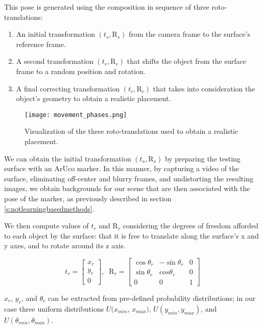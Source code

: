 This pose is generated using the composition in sequence of three roto-translations:

\begin{enumerate}
    \item An initial transformation $(t_s, \text{R}_s)$ from the camera frame to the surface's reference frame.
    \item A second transformation $(t_r, \text{R}_r)$ that shifts the object from the surface frame to a random position and rotation.
    \item A final correcting transformation $(t_c, \text{R}_c)$ that takes into consideration the object's geometry to obtain a realistic placement.
\end{enumerate}

\begin{figure}[ht]
    \texttt{[image: movement\_phases.png]}
    \caption{Visualization of the three roto-translations used to obtain a realistic placement.}
\end{figure}

We can obtain the initial transformation $(t_s, \text{R}_s)$ by preparing the testing surface with an ArUco marker. In this manner, by capturing a video of the surface, eliminating off-center and blurry frames, and undistorting the resulting images, we obtain backgrounds for our scene that are then associated with the pose of the marker, as previously described in section \ref*{s:notlearningbasedmethods}.

We then compute values of $t_r$ and $\text{R}_r$ considering the degrees of freedom afforded to each object by the surface: that it is free to translate along the surface's x and y axes, and to rotate around its z axis.

\begin{equation*}
    t_r = 
    \begin{bmatrix}
        x_r\\y_r\\0
    \end{bmatrix}
    ,\; \; \text{R}_r =
    \begin{bmatrix}
        \cos \theta_r & - \sin \theta_r & 0 \\
        \sin \theta_r & cos \theta_r & 0 \\
        0 & 0 & 1
    \end{bmatrix}
\end{equation*}

$x_r$, $y_r$, and  $\theta_r$ can be extracted from pre-defined probability distributions; in our case three uniform distributions $U(x_{min}$, $x_{max})$, $U(y_{min}, y_{max})$, and $U(\theta_{min}, \theta_{max})$.

